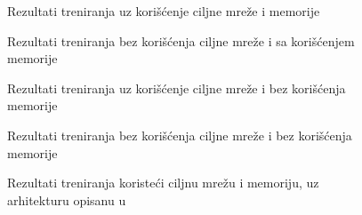 
\begin{figure}
	\centering
	\resizebox{1\linewidth}{!}{}
	\caption{Rezultati treniranja uz korišćenje ciljne mreže i memorije}
	\label{fig:dmim}
\end{figure}	
\begin{figure}
\centering
	\resizebox{1\linewidth}{!}{}
	\caption{Rezultati treniranja bez korišćenja ciljne mreže i sa korišćenjem memorije}
	\label{fig:jmim}
\end{figure}
\begin{figure}
\centering
	\resizebox{1\linewidth}{!}{}
	\caption{Rezultati treniranja uz korišćenje ciljne mreže i bez korišćenja memorije}
	\label{fig:dmnm}
\end{figure}
\begin{figure}
\centering
	\resizebox{1\linewidth}{!}{}
	\caption{Rezultati treniranja bez korišćenja ciljne mreže i bez korišćenja memorije}
	\label{fig:jmnm}
\end{figure}
\begin{figure}
\centering
	\resizebox{1\linewidth}{!}{}
	\caption{Rezultati treniranja koristeći ciljnu mrežu i memoriju, uz arhitekturu opisanu u \cite{dqn_mnih}}
	\label{fig:dvmim}
\end{figure}

